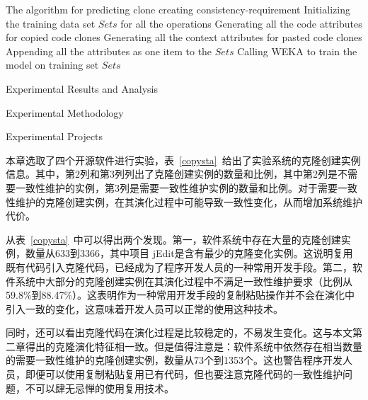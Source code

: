 \begin{minipage}{0.8\textwidth}
\centering
\begin{algorithm}[H]
 {The algorithm for predicting clone creating consistency-requirement}
\label{alg-creatingperdition}
Initializing the training data set $Sets$ for all the operations\; 
{ 
Generating all the code attributes for copied code clones\;
Generating all the context attributes for pasted code clones\;
Appending all the attributes as one item to the $Sets$\;
}
Calling WEKA to train the model on training set $Sets$\;
\end{algorithm}
\end{minipage}

{Experimental Results and Analysis}

{Experimental Methodology}

{Experimental Projects}

本章选取了四个开源软件进行实验，表~\ref{copysta}~给出了实验系统的克隆创建实例信息。其中，第2列和第3列列出了克隆创建实例的数量和比例，其中第2列是不需要一致性维护的实例，第3列是需要一致性维护实例的数量和比例。对于需要一致性维护的克隆创建实例，在其演化过程中可能导致一致性变化，从而增加系统维护代价。

从表~\ref{copysta}~中可以得出两个发现。第一，软件系统中存在大量的克隆创建实例，数量从633到3366，其中项目 jEdit是含有最少的克隆变化实例。这说明复用既有代码引入克隆代码，已经成为了程序开发人员的一种常用开发手段。第二，软件系统中大部分的克隆创建实例在其演化过程中不满足一致性维护要求（比例从59.8\%到88.47\%）。这表明作为一种常用开发手段的复制粘贴操作并不会在演化中引入一致的变化，这意味着开发人员可以正常的使用这种技术。

同时，还可以看出克隆代码在演化过程是比较稳定的，不易发生变化。这与本文第二章得出的克隆演化特征相一致。但是值得注意是：软件系统中依然存在相当数量的需要一致性维护的克隆创建实例，数量从73个到1353个。这也警告程序开发人员，即便可以使用复制粘贴复用已有代码，但也要注意克隆代码的一致性维护问题，不可以肆无忌惮的使用复用技术。

